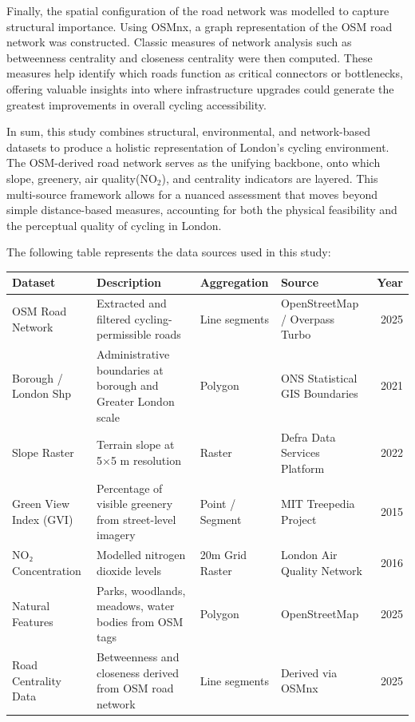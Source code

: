 \documentclass[
  12pt,
  oneside]{book}
\begin{document}
Finally, the spatial configuration of the road network was modelled to capture structural importance. Using OSMnx, a graph representation of the OSM road network was constructed. Classic measures of network analysis such as betweenness centrality and closeness centrality were then computed. These measures help identify which roads function as critical connectors or bottlenecks, offering valuable insights into where infrastructure upgrades could generate the greatest improvements in overall cycling accessibility.

In sum, this study combines structural, environmental, and network-based datasets to produce a holistic representation of London's cycling environment. The OSM-derived road network serves as the unifying backbone, onto which slope, greenery, air quality(NO\(_2\)), and centrality indicators are layered. This multi-source framework allows for a nuanced assessment that moves beyond simple distance-based measures, accounting for both the physical feasibility and the perceptual quality of cycling in London.

The following table represents the data sources used in this study:

\begin{table}
\centering
\begin{tabular}{llllr}
\toprule
\textbf{Dataset} & \textbf{Description} & \textbf{Aggregation} & \textbf{Source} & \textbf{Year}\\
\midrule
OSM Road Network & Extracted and filtered cycling-permissible roads & Line segments & OpenStreetMap / Overpass Turbo & 2025\\
Borough / London Shp & Administrative boundaries at borough and Greater London scale & Polygon & ONS Statistical GIS Boundaries & 2021\\
Slope Raster & Terrain slope at 5×5 m resolution & Raster & Defra Data Services Platform & 2022\\
Green View Index (GVI) & Percentage of visible greenery from street-level imagery & Point / Segment & MIT Treepedia Project & 2015\\
NO₂ Concentration & Modelled nitrogen dioxide levels & 20m Grid Raster & London Air Quality Network & 2016\\
\addlinespace
Natural Features & Parks, woodlands, meadows, water bodies from OSM tags & Polygon & OpenStreetMap & 2025\\
Road Centrality Data & Betweenness and closeness derived from OSM road network & Line segments & Derived via OSMnx & 2025\\
\bottomrule
\end{tabular}
\end{table}
\end{document}
